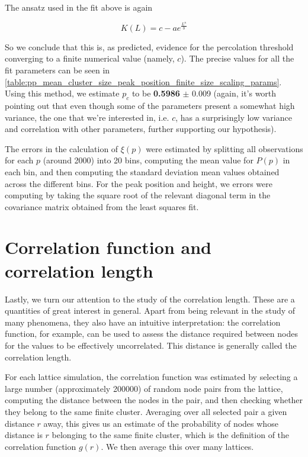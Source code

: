 The ansatz used in the fit above is again

$$ 
    K(L) = c - a e^{\frac{L^n}{b}}
$$

So we conclude that this is, as predicted, evidence for the percolation threshold converging to a finite numerical value (namely, $c$). The precise values for all the fit parameters can be seen in \autoref{table:pp_mean_cluster_size_peak_position_finite_size_scaling_params}. Using this method, we estimate $p_c$ to be \textbf{0.5986} $\pm$ 0.009 (again, it's worth pointing out that even though some of the parameters present a somewhat high variance, the one that we're interested in, i.e. $c$, has a surprisingly low variance and correlation with other parameters, further supporting our hypothesis).

The errors in the calculation of $\xi(p)$ were estimated by splitting all observations for each $p$ (around 2000) into 20 bins, computing the mean value for $P(p)$ in each bin, and then computing the standard deviation mean values obtained across the different bins. For the peak position and height, we errors were computing by taking the square root of the relevant diagonal term in the covariance matrix obtained from the least squares fit.

\section{Correlation function and correlation length}


Lastly, we turn our attention to the study of the correlation length. These are a quantities of great interest in general. Apart from being relevant in the study of many phenomena, they also have an intuitive interpretation: the correlation function, for example, can be used to assess the distance required between nodes for the values to be effectively uncorrelated. This distance is generally called the correlation length.

For each lattice simulation, the correlation function was estimated by  selecting a large number (approximately 200000) of random node pairs from the lattice, computing the distance between the nodes in the pair, and then checking whether they belong to the same finite cluster. Averaging over all selected pair a given distance $r$ away, this gives us an estimate of the probability of nodes whose distance is $r$ belonging to the same finite cluster, which is the definition of the correlation function $g(r)$. We then average this over many lattices.

